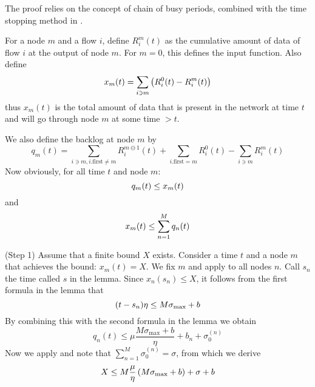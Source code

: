 \pr
The proof relies on the concept of chain of busy periods, combined
with the time stopping method in .

For a node $m$ and a flow $i$, define $R^m_i(t)$ as the cumulative
amount of data of flow $i$ at the output of node $m$. For $m=0$,
this defines the input function. Also define
\begin{equation}\mylabel{eq-lemfifodefx}
 x_m(t) = \sum_{i \ni m} \left( R^0_i(t) -R^m_i(t)\right)
\end{equation}
thus $x_m(t)$ is the total amount of data that is present in the
network at time $t$ and will go through node $m$ at some time $>
t$.

We also define the backlog at node $m$ by
 $$
 q_m(t)=\sum_{i \ni m, i. \mathrm{first}\neq m} R^{m \ominus 1}_i(t)
 +
 \sum_{i. \mathrm{first}= m} R^{0}_i(t)
 -
 \sum_{i \ni m} R^{m}_i(t)
 $$
Now obviously, for all time $t$ and node $m$:
\begin{equation}\mylabel{eq-ringisstable2}
  q_m(t) \leq x_m(t)
\end{equation}
and
\begin{equation}\mylabel{eq-ringisstable}
  x_m(t) \leq \sum_{n=1}^M q_n(t)
\end{equation}

(Step 1) Assume that a finite bound $X$ exists. Consider a time
$t$ and a node $m$ that achieves the bound: $x_m(t)=X$. We fix $m$
and apply  to all nodes $n$. Call $s_n$ the time
called $s$ in the lemma. Since $x_n(s_n) \leq X$, it follows from
the first formula in the lemma that
\begin{equation}\mylabel{eq-ring1}
(t-s_n) \eta \leq M \sigma_{\max}  + b
\end{equation}
By combining this with the second formula in the lemma we obtain
 $$q_n(t) \leq  \mu \frac{M \sigma_{\max}  + b}{\eta} + b_n + \sigma^{(n)}_0
 $$
Now we apply  and note that $\sum_{n=1}^M
\sigma^{(n)}_0=\sigma$, from which we derive
\begin{equation}\mylabel{eq-ring3}
X \leq M \frac{\mu}{\eta} \left( M \sigma_{\max} + b \right) +
\sigma + b
\end{equation}

